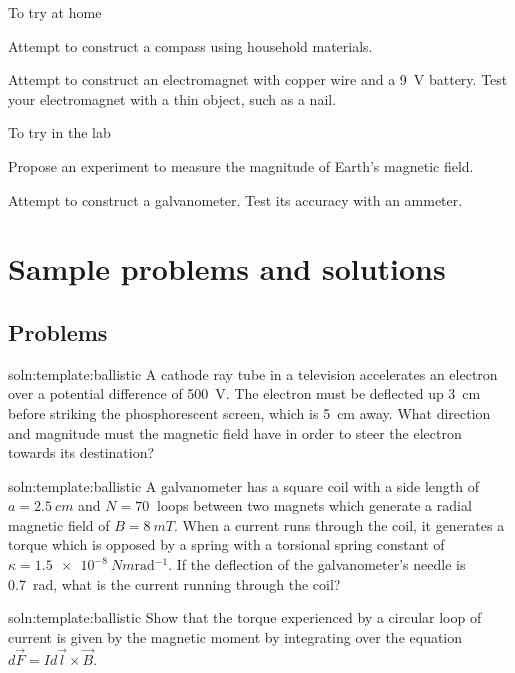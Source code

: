 \begin{chapteractivity}{To try at home}
{
\item Attempt to construct a compass using household materials.
\item Attempt to construct an electromagnet with copper wire and a \SI{9}{V} battery. Test your electromagnet with a thin object, such as a nail.
}
\end{chapteractivity}

\begin{chapteractivity}{To try in the lab}
{
\item Propose an experiment to measure the magnitude of Earth's magnetic field.
\item Attempt to construct a galvanometer. Test its accuracy with an ammeter.
}
\end{chapteractivity}

\newpage
\section{Sample problems and solutions}

\subsection{Problems}
\begin{problem}{soln:template:ballistic}{\label{prob:template:ballistic} 
A cathode ray tube in a television accelerates an electron over a potential difference of \SI{500}{V}. The electron must be deflected up \SI{3}{cm} before striking the phosphorescent screen, which is \SI{5}{cm} away. What direction and magnitude must the magnetic field have in order to steer the electron towards its destination?
}
\end{problem}

\begin{problem}{soln:template:ballistic}{\label{prob:template:ballistic} 
		A galvanometer has a square coil with a side length of $a=\SI{2.5}{cm}$ and $N=\SI{70}{}$ loops between two magnets which generate a radial magnetic field of $B=\SI{8}{mT}$. When a current runs through the coil, it generates a torque which is opposed by a spring with a torsional spring constant of $\kappa = \SI{1.5e-8}{Nm\radian^{-1}}$. If the deflection of the galvanometer's needle is \SI{0.7}{\radian}, what is the current running through the coil?
	}
\end{problem}

\begin{problem}{soln:template:ballistic}{\label{prob:template:ballistic} 
		Show that the torque experienced by a circular loop of current is given by the magnetic moment by integrating over the equation $d\vec F = Id\vec l \times \vec B$.
	}
\end{problem}

